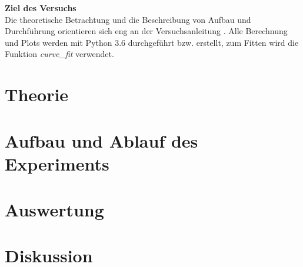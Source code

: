 \documentclass[a4,11pt]{article}
\newcommand{\V}{V21}
\begin{document}



\tableofcontents
\clearpage



\textbf{Ziel des Versuchs} \\
Die theoretische Betrachtung und die Beschreibung von Aufbau und Durchführung orientieren sich eng an der Versuchsanleitung \cite{\V}. Alle Berechnung und Plots werden mit Python 3.6 durchgeführt bzw. erstellt, zum Fitten wird die Funktion \textit{curve\_fit} verwendet.

\section{Theorie}

\clearpage


\section{Aufbau und Ablauf des Experiments}

\clearpage


\section{Auswertung}

\clearpage


\section{Diskussion}


\clearpage
\listoftodos
\listoffigures
\listoftables
\clearpage
\nocite{\V}
\printbibliography[title = Literaturverzeichnis]
\end{document}
